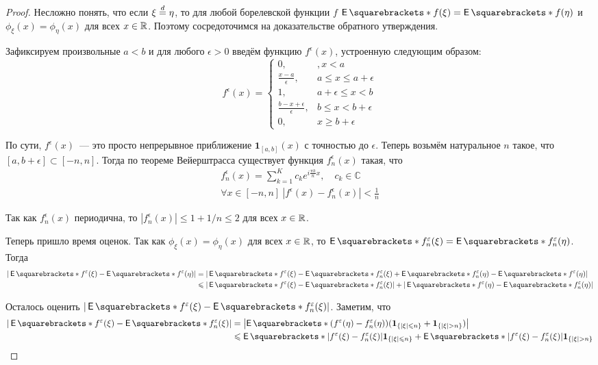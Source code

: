\begin{proof}
	Несложно понять, что если \(\xi \overset{d}{=} \eta\), то для любой борелевской 
	функции \(f\) \(\E{f(\xi)} = \E{f(\eta)}\) и \(\phi_{\xi}(x) = 
	\phi_{\eta}(x)\) для всех \(x \in \mathbb{R}\). Поэтому сосредоточимся на 
	доказательстве обратного утверждения.
	
	Зафиксируем произвольные \(a < b\) и для любого \(\epsilon > 0\) введём 
	функцию \(f^{\epsilon}(x)\), устроенную следующим образом:
	\[
		f^{\epsilon}(x) = \begin{cases}
		0,&, x < a \\
		\frac{x - a}{\epsilon},& a \leq x \leq a + \epsilon \\
		1,& a + \epsilon \leq x < b \\
		\frac{b - x + \epsilon}{\epsilon},& b \leq x < b + \epsilon \\
		0, & x \geq b + \epsilon
		\end{cases}
	\]
	
	По сути, \(f^{\epsilon}(x)\)~--- это просто непрерывное приближение 
	\(\mathbf{1}_{[a, b]}(x)\) с точностью до \(\epsilon\). Теперь возьмём 
	натуральное \(n\) такое, что \([a, b + \epsilon] \subset [-n, n]\). Тогда 
	по теореме Вейерштрасса существует функция \(f_{n}^{\epsilon}(x)\) такая, 
	что
	\begin{gather*}
		f_{n}^{\epsilon}(x) = \sum_{k = 1}^{K} c_{k}e^{i\frac{\pi k}{n}x},\quad 
		c_{k} \in \mathbb{C} \\
		\forall x \in [-n, n]\ |f^{\epsilon}(x) - f_{n}^{\epsilon}(x)| < 
		\frac{1}{n}
	\end{gather*}

	Так как \(f_{n}^{\epsilon}(x)\) периодична, то \(|f_{n}^{\epsilon}(x)| \leq 
	1 + 1/n \leq 2\) для всех \(x \in \mathbb{R}\).
	
	Теперь пришло время оценок. Так как \(\phi_{\xi}(x) = \phi_{\eta}(x)\) для 
	всех \(x \in \mathbb{R}\), то \(\E{f_{n}^{\epsilon}(\xi)} = \E{ 
	f_{n}^{\epsilon}(\eta)}\). Тогда 
	\begin{align*}
		|\E{f^{\epsilon}(\xi)} - \E{f^{\epsilon}(\eta)}| &= 
		|\E{f^{\epsilon}(\xi)} - \E{f_{n}^{\epsilon}(\xi)} + \E{ 
		f_{n}^{\epsilon}(\eta)} - \E{f^{\epsilon}(\eta)}| \\
		&\leq |\E{f^{\epsilon}(\xi)} - \E{f_{n}^{\epsilon}(\xi)}| + 
		|\E{f^{\epsilon}(\eta)} - \E{ f_{n}^{\epsilon}(\eta)}|
	\end{align*}

	Осталось оценить \(|\E{f^{\epsilon}(\xi)} - \E{f_{n}^{\epsilon}(\xi)}|\). 	
	Заметим, что
	\begin{align*}
		|\E{f^{\epsilon}(\xi)} - \E{f_{n}^{\epsilon}(\xi)}| &= 
		\left|\E{(f^{\epsilon}(\eta) - f_{n}^{\epsilon}(\eta)) 
		(\mathbf{1}_{\{|\xi| \leq n\}} + \mathbf{1}_{\{|\xi| > n\}})}\right|\\
		&\leq \E{|f^{\epsilon}(\xi) - f_{n}^{\epsilon}(\xi)| 
		\mathbf{1}_{\{|\xi| \leq n\}}} + \E{|f^{\epsilon}(\xi) - 
		f_{n}^{\epsilon}(\xi)| \mathbf{1}_{\{|\xi| > n\}}}
	\end{align*}


\end{proof}

